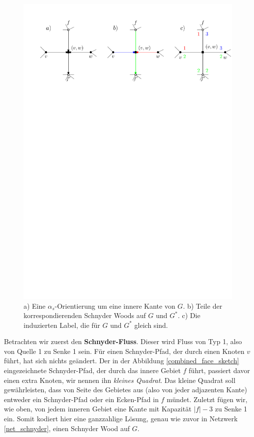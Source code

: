 \begin{figure}[h]
	\centering
  	\includegraphics[width=1\textwidth]{alpha_bij.pdf}
  	\caption{a) Eine $\alpha_s$-Orientierung um eine innere Kante von $G$. b) Teile der korrespondierenden Schnyder Woods auf $G$ und $G^*$. c) Die induzierten Label, die für $G$ und $G^*$ gleich sind.}
	\label{alpha_bij_graph}
\end{figure}

Betrachten wir zuerst den \textbf{Schnyder-Fluss}. Dieser wird Fluss von Typ 1, also von Quelle 1 zu Senke 1 sein. Für einen Schnyder-Pfad, der durch einen Knoten $v$ führt, hat sich nichts geändert. Der in der Abbildung \ref{combined_face_sketch} eingezeichnete Schnyder-Pfad, der durch das innere Gebiet $f$ führt, passiert davor einen extra Knoten, wir nennen ihn \textit{kleines Quadrat}. Das kleine Quadrat soll gewährleisten, dass von Seite des Gebietes aus (also von jeder adjazenten Kante) entweder ein Schnyder-Pfad oder ein Ecken-Pfad in $f$ mündet. Zuletzt fügen wir, wie oben, von jedem inneren Gebiet eine Kante mit Kapazität $|f|-3$ zu Senke 1 ein. Somit kodiert hier eine ganzzahlige Lösung, genau wie zuvor in Netzwerk \ref{net_schnyder}, einen Schnyder Wood auf $G$.

